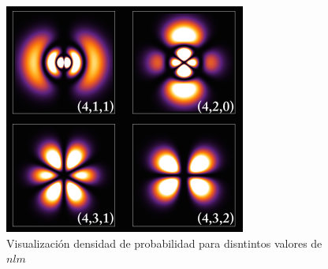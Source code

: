 \documentclass{article}
\begin{document}
\begin{tcolorbox}[breakable]
    \begin{figure}[H]
        \centering
        \includegraphics[scale=0.7]{images/p4_graph.png}
        \caption{Visualización densidad de probabilidad para disntintos valores de $nlm$}
    \end{figure}
\end{tcolorbox}
\end{document}

